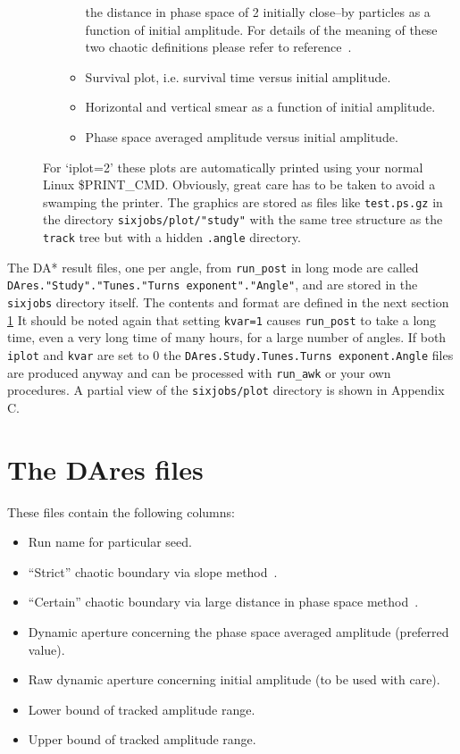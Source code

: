 \documentclass{cernatsnote}    %
\begin{document}
\begin{description}
\begin{itemize}
\begin{itemize}
      the distance in phase space of 2 initially close--by particles
      as a function of initial amplitude. For details of the meaning
      of these two chaotic definitions please refer to
      reference~\cite{LHC8}.
    \item Survival plot, i.e. survival time versus initial amplitude.
    \item Horizontal and vertical smear as a function of initial
      amplitude.
    \item Phase space averaged amplitude versus initial amplitude.
    \end{itemize}
  \end{itemize}
  For `iplot=2' these plots are automatically printed using
  your normal Linux \$PRINT\_CMD.
  Obviously, great care has to be taken to avoid a
  swamping the printer. The graphics are stored as files
  like {\tt test.ps.gz} in the directory  
  {\tt sixjobs/plot/"study"} with the same tree structure as the
  {\tt track} tree but with a hidden {\tt .angle} directory.
\end{description}

The DA* result files, one per angle, from {\tt run\_post} in long mode
are called {\tt DAres."Study"."Tunes."Turns exponent"."Angle"},
and are stored in the {\tt sixjobs} directory itself.
The contents and format are defined in the next section \ref{sec:DAres}
It should be noted again that setting {\tt kvar=1}
causes {\tt run\_post} to take a long time, even a very long time of
many hours, for a large number of angles. If both {\tt iplot} and
{\tt kvar} are set to 0 the {\tt DAres.Study.Tunes.Turns exponent.Angle}
files are produced anyway and can be processed with {\tt run\_awk} 
or your own procedures. A partial view of the {\tt sixjobs/plot} 
directory is shown in Appendix C.

\section{The DAres files}
\label{sec:DAres}
These files contain the following columns:
\begin{itemize}
\item Run name for particular seed.
\item ``Strict'' chaotic boundary via slope method~\cite{LHC8}.
\item ``Certain'' chaotic boundary via large distance in phase space
  method~\cite{LHC8}.
\item Dynamic aperture concerning the phase space averaged amplitude
  (preferred value).
\item Raw dynamic aperture concerning initial amplitude (to be used
  with care).
\item Lower bound of tracked amplitude range.
\item Upper bound of tracked amplitude range.
\end{itemize}
\end{document}

